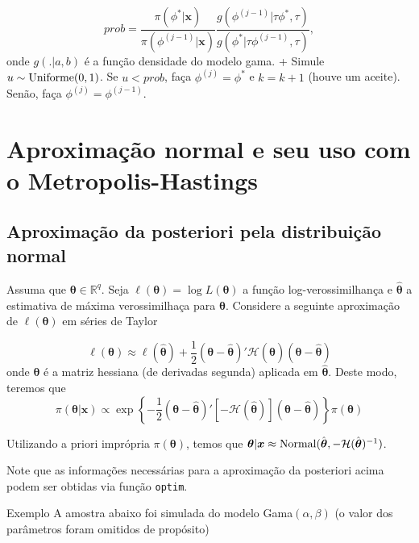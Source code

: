 \documentclass[
  letterpaper,
  DIV=11,
  numbers=noendperiod]{scrreprt}
\theoremstyle{plain}
\theoremstyle{definition}
\theoremstyle{definition}
\theoremstyle{remark}
\begin{document}
\[prob = \frac{\pi(\phi^*|\boldsymbol{x})}{\pi(\phi^{(j-1)}|\boldsymbol{x})}\frac{g(\phi^{(j-1)}|\tau\phi^*,\tau)}{g(\phi^*|\tau\phi^{(j-1)},\tau)},\]
onde \(g(.|a,b)\) é a função densidade do modelo gama. + Simule
\(u\sim\hbox{Uniforme}(0,1)\). Se \(u<prob\), faça \(\phi^{(j)}=\phi^*\)
e \(k=k+1\) (houve um aceite). Senão, faça \(\phi^{(j)}=\phi^{(j-1)}\).


\chapter{Aproximação normal e seu uso com o
Metropolis-Hastings}\label{aproximauxe7uxe3o-normal-e-seu-uso-com-o-metropolis-hastings}

\section{Aproximação da posteriori pela distribuição
normal}\label{aproximauxe7uxe3o-da-posteriori-pela-distribuiuxe7uxe3o-normal}

Assuma que \(\boldsymbol{\theta}\in\mathbb{R}^q\). Seja
\(\ell(\boldsymbol{\theta})=\log L(\boldsymbol{\theta})\) a função
log-verossimilhança e \(\hat{\boldsymbol{\theta}}\) a estimativa de
máxima verossimilhaça para \(\boldsymbol{\theta}\). Considere a seguinte
aproximação de \(\ell(\boldsymbol{\theta})\) em séries de Taylor

\[\ell(\boldsymbol{\theta})\approx  \ell(\hat{\boldsymbol{\theta}})+\frac{1}{2}(\boldsymbol{\theta}-\hat{\boldsymbol{\theta}})'\mathcal{H}(\hat{\boldsymbol{\theta}})(\boldsymbol{\theta}-\hat{\boldsymbol{\theta}})\]
onde \(\boldsymbol{\theta}\) é a matriz hessiana (de derivadas segunda)
aplicada em \(\hat{\boldsymbol{\theta}}\). Deste modo, teremos que
\[\pi(\boldsymbol{\theta}|\boldsymbol{x})\propto \exp\left\{-\frac{1}{2}(\boldsymbol{\theta}-\hat{\boldsymbol{\theta}})'\left[-\mathcal{H}(\hat{\boldsymbol{\theta}})\right](\boldsymbol{\theta}-\hat{\boldsymbol{\theta}})\right\}\pi(\boldsymbol{\theta})\]

Utilizando a priori imprópria \(\pi(\boldsymbol{\theta})\), temos que
\(\boldsymbol{\theta}|\boldsymbol{x}\approx \hbox{Normal}(\hat{\boldsymbol{\theta}},-\mathcal{H}(\hat{\boldsymbol{\theta}})^{-1})\).

Note que as informações necessárias para a aproximação da posteriori
acima podem ser obtidas via função \texttt{optim}.

Exemplo A amostra abaixo foi simulada do modelo Gama\((\alpha,\beta)\)
(o valor dos parâmetros foram omitidos de propósito)
\end{document}

